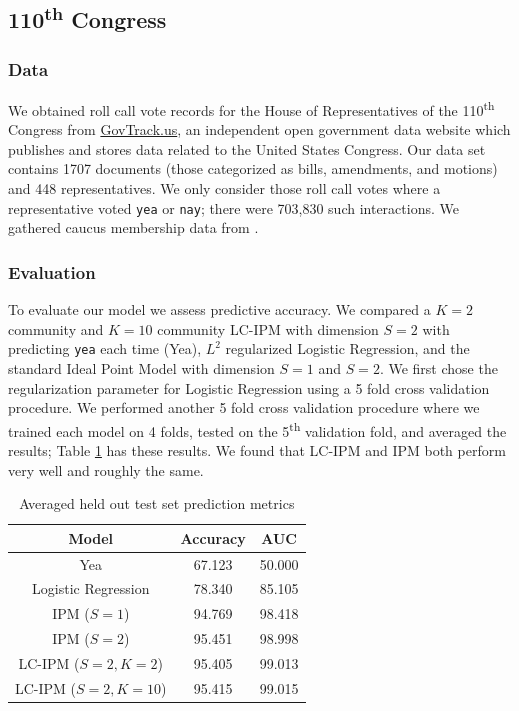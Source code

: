 \documentclass{article}
\begin{document}
\subsection{110\textsuperscript{th} Congress}
\subsubsection{Data}
We obtained roll call vote records for the House of Representatives of the 110\textsuperscript{th} Congress from \href{www.govtrack.us}{GovTrack.us}, an independent open government data website which publishes and stores data related to the United States Congress. Our data set contains 1707 documents (those categorized as bills, amendments, and motions) and 448 representatives. We only consider those roll call votes where a representative voted \texttt{yea} or \texttt{nay}; there were 703,830 such interactions. We gathered caucus membership data from \cite{Victor2013}.
\subsubsection{Evaluation} 
To evaluate our model we assess predictive accuracy. We compared a $K=2$ community and $K=10$ community LC-IPM with dimension $S=2$ with predicting \texttt{yea} each time (Yea), $L^2$ regularized Logistic Regression, and the standard Ideal Point Model with dimension $S=1$ and $S=2$. We first chose the regularization parameter for Logistic Regression using a 5 fold cross validation procedure. We performed another 5 fold cross validation procedure where we trained each model on 4 folds, tested on the 5\textsuperscript{th} validation fold, and averaged the results; Table \ref{table:results_table} has these results. We found that LC-IPM and IPM both perform very well and roughly the same.

\vspace{2ex}
\begin{table}
\begin{center}
\begin{tabular}{c | c |c}
Model &  Accuracy & AUC\\ %
\hline
\hline
Yea & 67.123 & 50.000\\
Logistic Regression & 78.340 & 85.105\\
\hline
IPM ($S= 1$)  &  94.769 & 98.418\\
IPM ($S= 2$)  & 95.451 & 98.998\\
\hline
LC-IPM ($S=2, K=2$)  & 95.405 & 99.013\\
LC-IPM ($S=2, K=10$)  & 95.415 & 99.015
\end{tabular}
\end{center}
\caption{Averaged held out test set prediction metrics}
\label{table:results_table}
\end{table} 
\end{document}

